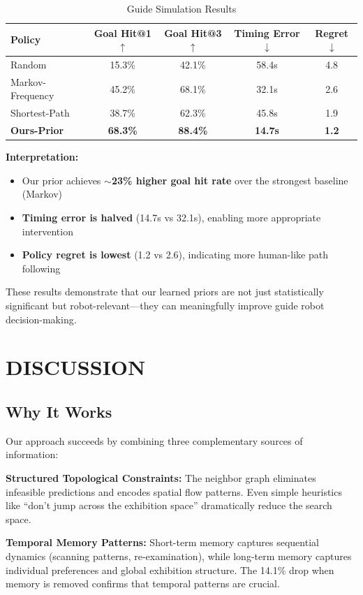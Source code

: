 \documentclass[letterpaper]{article}
\begin{document}
\begin{table}[h]
\centering
\caption{Guide Simulation Results}
\begin{tabular}{lcccc}
\toprule
Policy & Goal Hit@1$\uparrow$ & Goal Hit@3$\uparrow$ & Timing Error$\downarrow$ & Regret$\downarrow$ \\
\midrule
Random & 15.3\% & 42.1\% & 58.4s & 4.8 \\
Markov-Frequency & 45.2\% & 68.1\% & 32.1s & 2.6 \\
Shortest-Path & 38.7\% & 62.3\% & 45.8s & 1.9 \\
\textbf{Ours-Prior} & \textbf{68.3\%} & \textbf{88.4\%} & \textbf{14.7s} & \textbf{1.2} \\
\bottomrule
\end{tabular}
\label{tab:simulation}
\end{table}

\textbf{Interpretation:}
\begin{itemize}
    \item Our prior achieves \textbf{$\sim$23\% higher goal hit rate} over the strongest baseline (Markov)
    \item \textbf{Timing error is halved} (14.7s vs 32.1s), enabling more appropriate intervention
    \item \textbf{Policy regret is lowest} (1.2 vs 2.6), indicating more human-like path following
\end{itemize}

These results demonstrate that our learned priors are not just statistically significant but robot-relevant—they can meaningfully improve guide robot decision-making.

\section{DISCUSSION}

\subsection{Why It Works}

Our approach succeeds by combining three complementary sources of information:

\textbf{Structured Topological Constraints:} The neighbor graph eliminates infeasible predictions and encodes spatial flow patterns. Even simple heuristics like ``don't jump across the exhibition space'' dramatically reduce the search space.

\textbf{Temporal Memory Patterns:} Short-term memory captures sequential dynamics (scanning patterns, re-examination), while long-term memory captures individual preferences and global exhibition structure. The 14.1\% drop when memory is removed confirms that temporal patterns are crucial.
\end{document}
